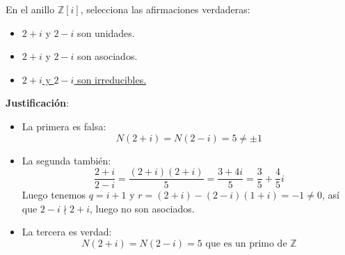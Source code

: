 \begin{ejercicio}
    En el anillo $\mathbb{Z}[i]$, selecciona las afirmaciones verdaderas:
    \begin{itemize}
        \item $2+ i$ y $2-i$ son unidades.
        \item $2+i$ y $2-i$ son asociados.
        \item \underline{$2+i$ y $2-i$ son irreducibles.}
    \end{itemize}

    \noindent
    \textbf{Justificación}:
    \begin{itemize}
        \item La primera es falsa:
            \begin{equation*}
                N(2+i) = N(2-i) = 5 \neq \pm 1
            \end{equation*}
        \item La segunda también:
            \begin{equation*}
                \dfrac{2+i}{2-i} = \dfrac{(2+i)(2+i)}{5} = \dfrac{3+4i}{5} = \dfrac{3}{5}+\dfrac{4}{5}i
            \end{equation*}
            Luego tenemos $q=i+1$ y $r=(2+i)-(2-i)(1+i)=-1\neq 0$, así que $2-i\nmid 2+i$, luego no son asociados.
        \item La tercera es verdad:
            \begin{equation*}
                N(2+i) = N(2-i) = 5 \text{\ que\ es\ un\ primo\ de\ } \mathbb{Z}
            \end{equation*}
    \end{itemize}
\end{ejercicio}

